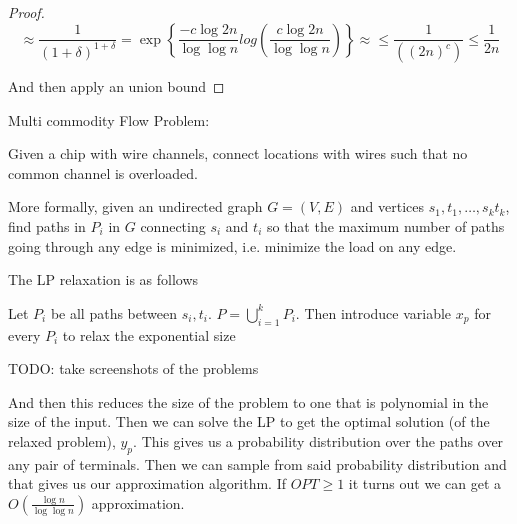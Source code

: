 \documentclass[../notes.tex]{subfiles}
\begin{document}
\begin{example}
\begin{proof}
\begin{equation}
    \approx \frac{1}{(1+\delta)^{1+\delta}} = \exp \left\{ \frac{-c \log 2n}{\log \log n} 
        log \left( \frac{c \log 2n}{\log \log n} \right) \right\}
    \approx \le \frac{1}{((2n)^c)} \le  \frac{1}{2n}
\end{equation}


And then apply an union bound



    
\end{proof}

\end{example}



\begin{example}
    Multi commodity Flow Problem:

    Given a chip with wire channels, connect locations with wires such that no common channel is overloaded.

    More formally, given an undirected graph $ G = (V, E) $ and vertices $ s_1, t_1, \ldots, s_k t_k$, find paths in $ P_i $ in $ G $ connecting $ s_i $ and $ t_i $ so that the maximum number of paths going through any edge is minimized, i.e. minimize the load on any edge.
\end{example}

The LP relaxation is as follows

Let $ P_i $ be all paths between $ s_i, t_i $. $ P = \bigcup^k_{i=1} P_i $.
Then introduce variable $ x_p $ for every $ P_i $ to relax the exponential size

TODO: take screenshots of the problems

And then this reduces the size of the problem to one that is polynomial in the size of the input. 
Then we can solve the LP to get the optimal solution (of the relaxed problem), $ y_p $.
This gives us a probability distribution over the paths over any pair of terminals. Then we can sample from said probability distribution and that gives us our approximation algorithm.
If $ OPT \ge 1 $ it turns out we can get a $ O(\frac{\log n}{ \log \log n }) $ approximation.
\end{document}
